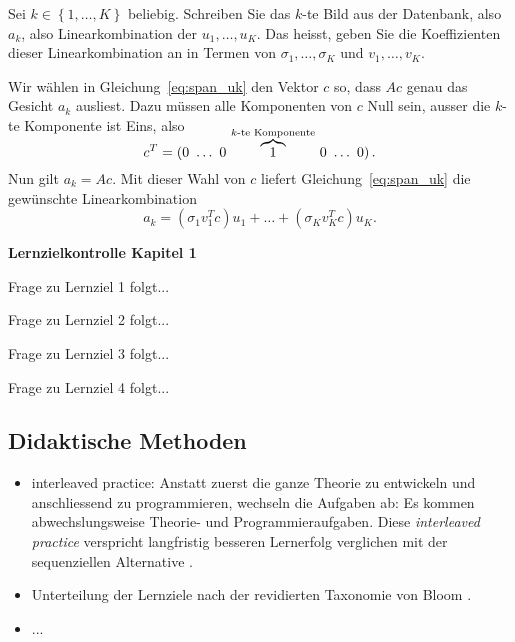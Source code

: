 \begin{aufgabe}
	Sei $k\in\left\{1,\ldots,K\right\}$ beliebig.
	Schreiben Sie das $k$-te Bild aus der Datenbank, also $a_k$, also Linearkombination der $u_1,\ldots,u_K$.
	Das heisst, geben Sie die Koeffizienten dieser Linearkombination an in Termen von $\sigma_1,\ldots,\sigma_K$ und $v_1,\dots,v_K$.
\end{aufgabe}
\begin{losung*}
	Wir wählen in Gleichung~\ref{eq:span_uk} den Vektor $c$ so, dass $Ac$ genau das Gesicht $a_k$ ausliest.
	Dazu müssen alle Komponenten von $c$ Null sein, ausser die $k$-te Komponente ist Eins, also
	\begin{equation*}
		c^T=\left(0\ \ldots\ 0\ \smash{\overbrace{1}^{k\textrm{-te Komponente}}}\ 0\ \ldots\ 0\right).
	\end{equation*}
	Nun gilt $a_k=Ac$.
	Mit dieser Wahl von $c$ liefert Gleichung~\eqref{eq:span_uk} die gewünschte Linearkombination
	\begin{equation*}
		a_k=\left(\sigma_1 v_1^Tc\right) u_1+\ldots+\left(\sigma_K v_K^Tc\right) u_K.
	\end{equation*}
\end{losung*}

\begin{tcolorbox}
	\centerline{\textbf{Lernzielkontrolle Kapitel 1}}
	\begin{aufgabe}
		Frage zu Lernziel 1 folgt...
	\end{aufgabe}
	\begin{aufgabe}
		Frage zu Lernziel 2 folgt...
	\end{aufgabe}
	\begin{aufgabe}
		Frage zu Lernziel 3 folgt...
	\end{aufgabe}
	\begin{aufgabe}
		Frage zu Lernziel 4 folgt...
	\end{aufgabe}
\end{tcolorbox}

\subsection{Didaktische Methoden}
\begin{itemize}
	\item interleaved practice: Anstatt zuerst die ganze Theorie zu entwickeln und anschliessend zu programmieren, wechseln die Aufgaben ab: Es kommen abwechslungsweise Theorie- und Programmieraufgaben.
	Diese \textit{interleaved practice} verspricht langfristig besseren Lernerfolg verglichen mit der sequenziellen Alternative \cite{Rohrer14}.
	\item Unterteilung der Lernziele nach der revidierten Taxonomie von Bloom \cite{Anderson2001}.
	\item ...
\end{itemize}